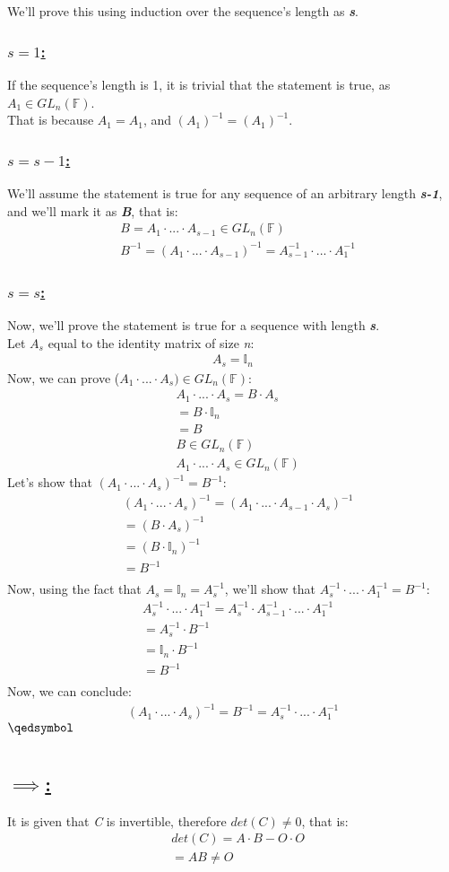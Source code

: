 \documentclass[a4paper, 12pt]{article}
\newcommand{\sub}[1]{\subsection{\underline{#1}}}
\newcommand{\subsub}[1]{\subsubsection{\underline{#1}}}
\newcommand{\F}{\ensuremath{\mathbb{F}}}
\newcommand{\eq}[1]{\begin{align*}#1\end{align*}}
\renewcommand{\qed}{\hfill\(\qedsymbol\)}
\begin{document}
\setcounter{section}{13}
\section{}
We'll prove this using induction over the sequence's length as \textit{\textbf{s}}.
\subsub{$s=1$:}
If the sequence's length is 1, it is trivial that the statement is true, as ${A}_1\in{GL}_n(\F)$.\\
That is because $A_1=A_1$, and $(A_1)^{-1}=(A_1)^{-1}$.
\subsub{$s=s-1$:}
We'll assume the statement is true for any sequence of an arbitrary length \textit{\textbf{s-1}}, and we'll mark it as \textit{\textbf{B}}, that is:
\eq{
    &B=A_1\cdot...\cdot{A}_{s-1}\in{GL}_n(\F)\\
    &B^{-1}=(A_1\cdot...\cdot{A}_{s-1})^{-1}=A_{s-1}^{-1}\cdot...\cdot{A}_{1}^{-1}
}
\subsub{$s=s$:}
Now, we'll prove the statement is true for a sequence with length \textit{\textbf{s}}.\\
Let $A_s$ equal to the identity matrix of size \textit{n}:
\eq{
    A_s=\mathbb{I}_n
}
Now, we can prove ($A_1\cdot...\cdot{A}_s)\in{GL}_n(\F)$:
\eq{
    &A_1\cdot...\cdot{A}_s=B\cdot{A}_{s}\\
    &=B\cdot\mathbb{I}_n\\
    &=B\\
    &B\in{GL}_n(\F)\\
    &A_1\cdot...\cdot{A}_s\in{GL}_n(\F)
}
Let's show that $(A_1\cdot...\cdot{A}_{s})^{-1}=B^{-1}$:
\eq{
    &(A_1\cdot...\cdot{A}_{s})^{-1}=(A_1\cdot...\cdot{A}_{s-1}\cdot{A}_{s})^{-1}\\
    &=(B\cdot{A}_{s})^{-1}\\
    &=(B\cdot\mathbb{I}_n)^{-1}\\
    &=B^{-1}\\
}
Now, using the fact that ${A}_{s}=\mathbb{I}_n={A}_{s}^{-1}$, we'll show that ${A}_{s}^{-1}\cdot...\cdot{A}_{1}^{-1}=B^{-1}$:
\eq{
    &{A}_{s}^{-1}\cdot...\cdot{A}_{1}^{-1}={A}_{s}^{-1}\cdot{A}_{s-1}^{-1}\cdot...\cdot{A}_{1}^{-1}\\
    &={A}_{s}^{-1}\cdot{B}^{-1}\\
    &=\mathbb{I}_n\cdot{B}^{-1}\\
    &={B}^{-1}\\
}
Now, we can conclude:
\eq{
    (A_1\cdot...\cdot{A}_{s})^{-1}={B}^{-1}={A}_{s}^{-1}\cdot...\cdot{A}_{1}^{-1}
}
\qed\pagebreak

\setcounter{section}{16}
\section{}
\sub{$\implies$:}
It is given that \textit{C} is invertible, therefore $det(C)\neq{0}$, that is:
\eq{
    &det(C)=A\cdot{B}-O\cdot{O}\\
    &=AB\neq{O}
}
\end{document}
